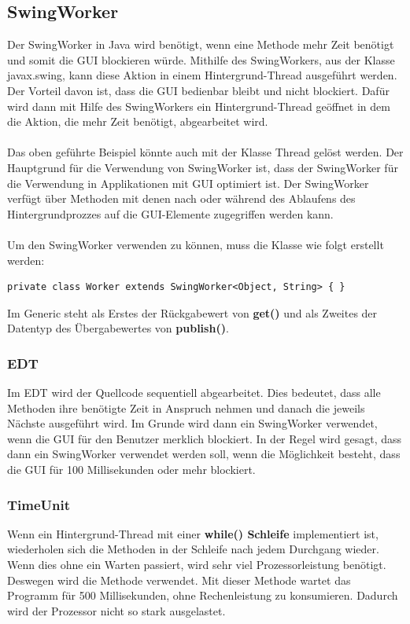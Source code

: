 \subsection{SwingWorker}
Der SwingWorker in Java wird benötigt, wenn eine Methode mehr Zeit benötigt und somit die \ac{GUI} blockieren würde. Mithilfe des SwingWorkers, aus der Klasse javax.swing, kann diese Aktion in einem Hintergrund-Thread ausgeführt werden. Der Vorteil davon ist, dass die \ac{GUI} bedienbar bleibt und nicht blockiert. Dafür wird dann mit Hilfe des SwingWorkers ein Hintergrund-Thread geöffnet in dem die Aktion, die mehr Zeit benötigt, abgearbeitet wird.
\\ \\
Das oben geführte Beispiel könnte auch mit der Klasse Thread gelöst werden. Der Hauptgrund für die Verwendung von SwingWorker ist, dass der SwingWorker für die Verwendung in Applikationen mit \ac{GUI} optimiert ist. Der SwingWorker verfügt über Methoden mit denen nach oder während des Ablaufens des Hintergrundprozzes auf die \ac{GUI}-Elemente zugegriffen werden kann.
\\ \\ 
Um den SwingWorker verwenden zu können, muss die Klasse wie folgt erstellt werden:
\begin{lstlisting}[style=JavaStyle, caption=SwingWorker Klasse erstellen]
	private class Worker extends SwingWorker<Object, String> { } 
\end{lstlisting}
Im Generic steht als Erstes der Rückgabewert von \textbf{get()} und als Zweites der Datentyp des Übergabewertes von \textbf{publish()}.

\newpage

\subsubsection{EDT}
Im \ac{EDT} wird der Quellcode sequentiell abgearbeitet. Dies bedeutet, dass alle Methoden ihre benötigte Zeit in Anspruch nehmen und danach die jeweils Nächste ausgeführt wird. Im Grunde wird dann ein SwingWorker verwendet, wenn die \ac{GUI} für den Benutzer merklich blockiert. In der Regel wird gesagt, dass dann ein SwingWorker verwendet werden soll, wenn die Möglichkeit besteht, dass die \ac{GUI} für 100 Millisekunden oder mehr blockiert.

\subsubsection{TimeUnit}
Wenn ein Hintergrund-Thread mit einer \textbf{while() Schleife} implementiert ist, wiederholen sich die Methoden in der Schleife nach jedem Durchgang wieder. Wenn dies ohne ein Warten passiert, wird sehr viel Prozessorleistung benötigt. \\ Deswegen wird die Methode  verwendet. Mit dieser Methode wartet das Programm für 500 Millisekunden, ohne Rechenleistung zu konsumieren. Dadurch wird der Prozessor nicht so stark ausgelastet. 


